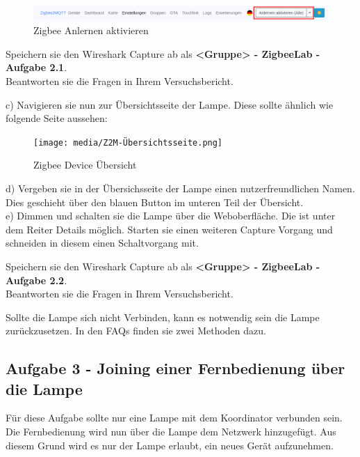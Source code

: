 \begin{figure}[H]
    \centering
    \includegraphics[width=1\textwidth]{media/Z2M-Anlernen.png}
    \caption{Zigbee Anlernen aktivieren}
\end{figure}

\begin{Aufgabe}
    Speichern sie den Wireshark Capture ab als \textbf{\grqq <Gruppe> - ZigbeeLab - Aufgabe 2.1\grqq{}}. \\
    Beantworten sie die Fragen in Ihrem Versuchsbericht.
\end{Aufgabe}

c) Navigieren sie nun zur Übersichtsseite der Lampe. Diese sollte ähnlich wie folgende Seite aussehen:

\begin{figure}[H]
    \centering
    \texttt{[image: media/Z2M-Übersichtsseite.png]}
    \caption{Zigbee Device Übersicht}
\end{figure}

d) Vergeben sie in der Übersichsseite der Lampe einen nutzerfreundlichen Namen. Dies geschieht über den blauen Button im unteren Teil der Übersicht.\\
e) Dimmen und schalten sie die Lampe über die Weboberfläche. Die ist unter dem Reiter \grqq Details\grqq{} möglich. Starten sie einen weiteren Capture Vorgang und
schneiden in diesem einen Schaltvorgang mit.

\begin{Aufgabe}
    Speichern sie den Wireshark Capture ab als \textbf{\grqq <Gruppe> - ZigbeeLab - Aufgabe 2.2\grqq{}}. \\
    Beantworten sie die Fragen in Ihrem Versuchsbericht.
\end{Aufgabe}

\begin{Hinweis}
Sollte die Lampe sich nicht Verbinden, kann es notwendig sein die Lampe zurückzusetzen. In den FAQs finden sie zwei Methoden dazu.
\end{Hinweis}

\subsection{Aufgabe 3 - Joining einer Fernbedienung über die Lampe}
Für diese Aufgabe sollte nur eine Lampe mit dem Koordinator verbunden sein. Die Fernbedienung wird nun über die Lampe dem Netzwerk hinzugefügt. Aus diesem Grund wird es nur der Lampe
erlaubt, ein neues Gerät aufzunehmen. 

